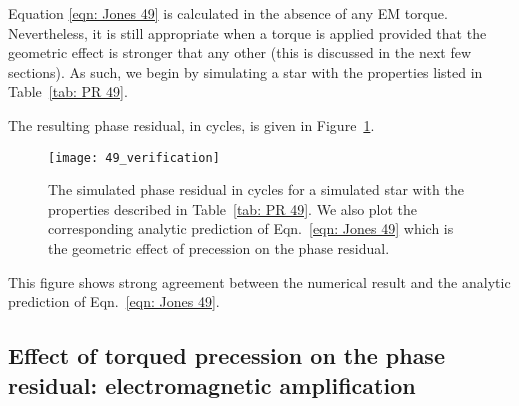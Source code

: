 \documentclass[../full_thesis/full_thesis.tex]{subfiles}
\newcommand{\thisdir}{../inertial_frame}
\begin{document}
Equation \eqref{eqn: Jones 49} is calculated in the absence of any EM torque.
Nevertheless, it is still appropriate when a torque is applied provided
that the geometric effect is stronger that any other (this is discussed in
the next few sections). As such, we begin by simulating a star with the
properties listed in Table~\ref{tab: PR 49}.
\begin{table}[htb]
\centering

\caption{Simulation parameters used for the phase residual plotted in
Figure~\ref{fig: PR 49}. Note that $\Aem$ is the electromagnetic amplification
factor defined later in Eqn.~\eqref{eqn: EM amplification}.}
\label{tab: PR 49}
\end{table}
The resulting phase residual, in cycles, is
given in Figure~\ref{fig: PR 49}.
\begin{figure}[htb]
\centering
\texttt{[image: 49\_verification]}
\caption{The simulated phase residual in cycles for a simulated star with the
properties described in Table~\ref{tab: PR 49}. We also plot the corresponding
analytic prediction of Eqn.~\eqref{eqn: Jones 49} which is the geometric effect
of precession on the phase residual.}
\label{fig: PR 49}
\end{figure}
This figure shows strong agreement between the numerical result and the
analytic prediction of Eqn.~\eqref{eqn: Jones 49}.

\subsection{Effect of torqued precession on the phase residual: electromagnetic amplification}
\label{sec: phase residual torqued}
\end{document}
